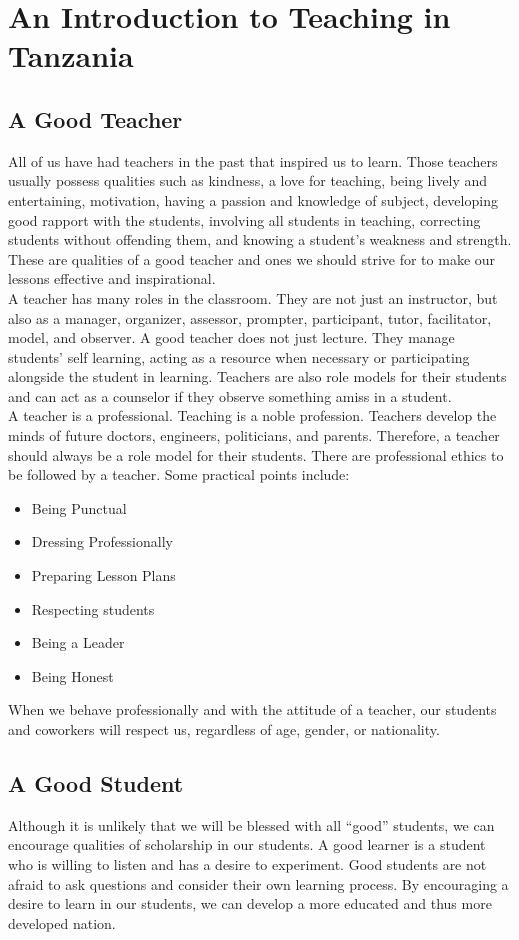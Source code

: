 \chapter{An Introduction to Teaching in Tanzania}
\section{A Good Teacher}
All of us have had teachers in the past that inspired us to learn.  Those teachers usually possess qualities such as kindness, a love for teaching, being lively and entertaining, motivation, having a passion and knowledge of subject, developing good rapport with the students, involving all students in teaching, correcting students without offending them, and knowing a student's weakness and strength.  These are qualities of a good teacher and ones we should strive for to make our lessons effective and inspirational.\\

A teacher has many roles in the classroom.  They are not just an instructor, but also as a manager, organizer, assessor, prompter, participant, tutor, facilitator, model, and observer.  A good teacher does not just lecture.  They manage students' self learning, acting as a resource when necessary or participating alongside the student in learning.  Teachers are also role models for their students and can act as a counselor if they observe something amiss in a student.\\

A teacher is a professional. Teaching is a noble profession.  Teachers develop the minds of future doctors, engineers, politicians, and parents.  Therefore, a teacher should always be a role model for their students. There are professional ethics to be followed by a teacher. Some practical points include:
\begin{itemize}
\item Being Punctual
\item Dressing Professionally
\item Preparing Lesson Plans
\item Respecting students 
\item Being a Leader
\item Being Honest
\end{itemize}

When we behave professionally and with the attitude of a teacher, our students and coworkers will respect us, regardless of age, gender, or nationality.  

\section{A Good Student}
Although it is unlikely that we will be blessed with all ``good'' students, we can encourage qualities of scholarship in our students.  A good learner is a student who is willing to listen and has a desire to experiment.  Good students are not afraid to ask questions and consider their own learning process.  By encouraging a desire to learn in our students, we can develop a more educated and thus more developed nation. \\

